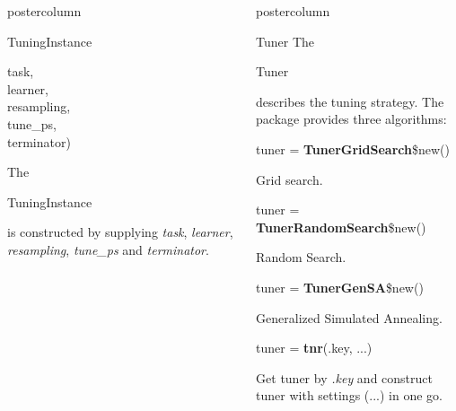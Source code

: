 \documentclass{beamer}
\newlength{\columnheight} %
\newcommand{\codeinline}[1]{\begin{codeboxinline}#1\end{codeboxinline}}
\begin{document}
\begin{frame}[fragile]{}
\begin{columns}
\begin{column}{.245\textwidth}
\begin{beamercolorbox}[center]{postercolumn}
\begin{minipage}{.98\textwidth}
{\begin{myblock}{TuningInstance}
\begin{codeboxmultiline}[width=18cm]
								\hspace*{1ex}task,\\
								\hspace*{1ex}learner,\\
								\hspace*{1ex}resampling,\\
								\hspace*{1ex}tune\_ps,\\
								\hspace*{1ex}terminator)
							\end{codeboxmultiline}
							The \codeinline{TuningInstance} is constructed by supplying \textit{task}, \textit{learner}, \textit{resampling}, \textit{tune\_ps} and \textit{terminator}.
							\\
						\end{myblock}
						\vfill}
				\end{minipage}
			\end{beamercolorbox}
		\end{column}
		\begin{column}{.245\textwidth}
			\begin{beamercolorbox}[center]{postercolumn}
				\begin{minipage}{.98\textwidth}
					\parbox[t][\columnheight]{\textwidth}{
						\begin{myblock}{Tuner}
							The \codeinline{Tuner} describes the tuning strategy. The package provides three algorithms:
							\\
							\begin{codebox}
								tuner = \textbf{TunerGridSearch}\$new()
							\end{codebox}
							Grid search.
							\\
							\begin{codebox}
								tuner = \textbf{TunerRandomSearch}\$new()
							\end{codebox}
							Random Search.
							\\
							\begin{codebox}
								tuner = \textbf{TunerGenSA}\$new()
							\end{codebox}
							Generalized Simulated Annealing.
							\\
							\begin{codebox}
								tuner = \textbf{tnr}(.key, ...)
							\end{codebox}
							Get tuner by \textit{.key} and construct tuner with settings (...) in one go.
						\end{myblock}
}
\end{minipage}
\end{beamercolorbox}
\end{column}
\end{columns}
\end{frame}
\end{document}
